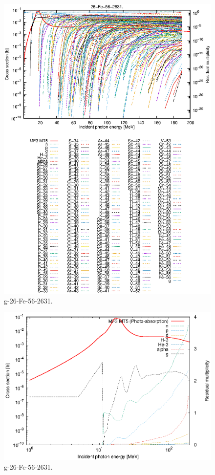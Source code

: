 \begin{figure}
 \includegraphics[width=\linewidth]{eps/g_26-Fe-56_2631.eps}
  \caption{g-26-Fe-56-2631.}
\end{figure}
\newpage \clearpage

\begin{figure}
 \includegraphics[width=\linewidth]{eps-log/g_26-Fe-56_2631.eps}
 \caption{g-26-Fe-56-2631.}
\end{figure}
\newpage \clearpage

